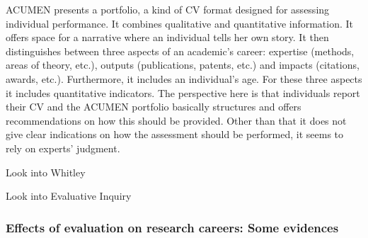 \documentclass[]{elsarticle} %
\begin{document}
ACUMEN presents a portfolio, a kind of CV format designed for assessing
individual performance. It combines qualitative and quantitative
information. It offers space for a narrative where an individual tells
her own story. It then distinguishes between three aspects of an
academic's career: expertise (methods, areas of theory, etc.), outputs
(publications, patents, etc.) and impacts (citations, awards, etc.).
Furthermore, it includes an individual's age. For these three aspects it
includes quantitative indicators. The perspective here is that
individuals report their CV and the ACUMEN portfolio basically
structures and offers recommendations on how this should be provided.
Other than that it does not give clear indications on how the assessment
should be performed, it seems to rely on experts' judgment.

Look into Whitley

Look into Evaluative Inquiry

\hypertarget{effects-of-evaluation-on-research-careers-some-evidences}{%
\subsubsection{Effects of evaluation on research careers: Some
evidences}\label{effects-of-evaluation-on-research-careers-some-evidences}}
\end{document}
